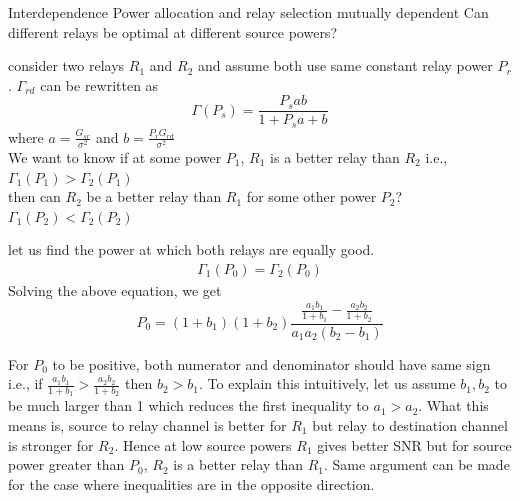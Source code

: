 \documentclass{beamer}
\begin{document}
\begin{frame}{Interdependence}
	\vspace{-1cm}
	Power allocation and relay selection mutually dependent
	\vspace{1cm}
	Can different relays be optimal at different
	source powers?
\end{frame}

\begin{frame}{}
consider two
relays $R_1$ and $R_2$ and assume both use same constant relay power $P_r$.
	$\Gamma_{rd}$ can be rewritten as
	\begin{equation*}
			\Gamma(P_s) = \frac{P_s ab}{1+P_s a + b} 
	\end{equation*}
	where $a = \frac{G_{sr}}{\sigma^2}$ and $b = \frac{P_{r} G_{r d}}{\sigma^2}$
\\
	We want to know if at some power $P_1$, $R_1$ is a better
	relay than $R_2$ i.e., \\ $\Gamma_1(P_1) > \Gamma_2(P_1)$ \\ then can $R_2$ be 
	a better relay than $R_1$ for some other power $P_2$? \\
	$\Gamma_1(P_2) < \Gamma_2(P_2)$
\end{frame}
\begin{frame}
let us find the power at which both relays are equally good.
	\begin{align*}
			\Gamma_1(P_0) = \Gamma_2(P_0)
	\end{align*}
	Solving the above equation, we get
	\begin{equation*}
			P_0 = (1+b_1)(1+b_2) \frac{\frac{a_1b_1}{1+b_1} - 
				\frac{a_2b_2}{1+b_2}}{a_1a_2(b_2-b_1)}
	\end{equation*}
\end{frame}
\begin{frame}
	For $P_0$ to be positive, both numerator and denominator should 
	have same sign i.e., if 
	$\frac{a_1b_1}{1+b_1} >	\frac{a_2b_2}{1+b_2}$ then $b_2 > b_1$.
	To explain this intuitively, let us assume $b_1,b_2$ to be 
	much larger than 1 which reduces the first inequality to
	$a_1 > a_2$. What this means is, source to relay channel is 
	better for $R_1$ but relay to destination channel is stronger
	for $R_2$. Hence at low source powers $R_1$ gives
	better SNR but for  source power greater than  $P_0$, $R_2$ 
	is a better relay than $R_1$. Same argument can be made 
	for the case where inequalities are in the opposite
	direction. 
	\\
\end{frame}
\end{document}
